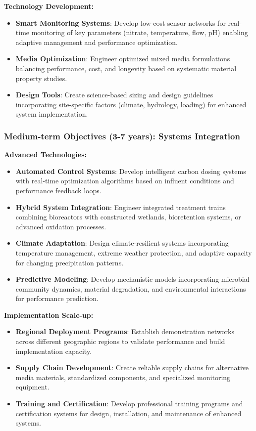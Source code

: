 \documentclass[12pt,a4paper]{article}
\begin{document}
\textbf{Technology Development:}
\begin{itemize}
\item \textbf{Smart Monitoring Systems}: Develop low-cost sensor networks for real-time monitoring of key parameters (nitrate, temperature, flow, pH) enabling adaptive management and performance optimization.
\item \textbf{Media Optimization}: Engineer optimized mixed media formulations balancing performance, cost, and longevity based on systematic material property studies.
\item \textbf{Design Tools}: Create science-based sizing and design guidelines incorporating site-specific factors (climate, hydrology, loading) for enhanced system implementation.
\end{itemize}

\subsubsection{Medium-term Objectives (3-7 years): Systems Integration}

\textbf{Advanced Technologies:}
\begin{itemize}
\item \textbf{Automated Control Systems}: Develop intelligent carbon dosing systems with real-time optimization algorithms based on influent conditions and performance feedback loops.
\item \textbf{Hybrid System Integration}: Engineer integrated treatment trains combining bioreactors with constructed wetlands, bioretention systems, or advanced oxidation processes.
\item \textbf{Climate Adaptation}: Design climate-resilient systems incorporating temperature management, extreme weather protection, and adaptive capacity for changing precipitation patterns.
\item \textbf{Predictive Modeling}: Develop mechanistic models incorporating microbial community dynamics, material degradation, and environmental interactions for performance prediction.
\end{itemize}

\textbf{Implementation Scale-up:}
\begin{itemize}
\item \textbf{Regional Deployment Programs}: Establish demonstration networks across different geographic regions to validate performance and build implementation capacity.
\item \textbf{Supply Chain Development}: Create reliable supply chains for alternative media materials, standardized components, and specialized monitoring equipment.
\item \textbf{Training and Certification}: Develop professional training programs and certification systems for design, installation, and maintenance of enhanced systems.
\end{itemize}
\end{document}
